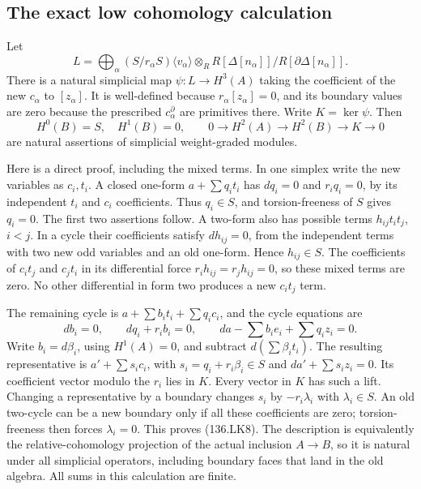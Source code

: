 \subsection{The exact low cohomology calculation}

Let
\[
 L=\bigoplus_\alpha(S/r_\alpha S)\langle v_\alpha\rangle
       \otimes_R
       R[\Delta[n_\alpha]]/R[\partial\Delta[n_\alpha]].
                                                               \tag{136.LK7}
\]
There is a natural simplicial map
\(\psi:L\to H^3(A)\) taking the coefficient of the new
\(c_\alpha\) to \([z_\alpha]\).  It is well-defined
because \(r_\alpha[z_\alpha]=0\), and its boundary values
are zero because the prescribed \(c_\alpha^\partial\)
are primitives there.  Write \(K=\ker\psi\).  Then
\[
 H^0(B)=S,\quad H^1(B)=0,\qquad
 0\longrightarrow H^2(A)\longrightarrow H^2(B)
                   \longrightarrow K\longrightarrow0
                                                               \tag{136.LK8}
\]
are natural assertions of simplicial weight-graded modules.

Here is a direct proof, including the mixed terms.  In one
simplex write the new variables as \(c_i,t_i\).  A closed
one-form \(a+\sum q_i t_i\) has \(dq_i=0\) and
\(r_iq_i=0\), by its independent \(t_i\) and \(c_i\)
coefficients.  Thus \(q_i\in S\), and torsion-freeness
of \(S\) gives \(q_i=0\).  The first two assertions follow.
A two-form also has possible terms \(h_{ij}t_it_j\),
\(i<j\).  In a cycle their coefficients satisfy
\(dh_{ij}=0\), from the independent terms with two new odd
variables and an old one-form.  Hence \(h_{ij}\in S\).
The coefficients of \(c_it_j\) and \(c_jt_i\) in its
differential force \(r_i h_{ij}=r_j h_{ij}=0\), so these
mixed terms are zero.  No other differential in form two
produces a new \(c_i t_j\) term.

The remaining cycle is
\(a+\sum b_i t_i+\sum q_i c_i\), and the cycle equations are
\[
 db_i=0,\qquad dq_i+r_i b_i=0,\qquad
              da-\sum b_i e_i+\sum q_i z_i=0.
                                                               \tag{136.LK9}
\]
Write \(b_i=d\beta_i\), using \(H^1(A)=0\), and
subtract \(d(\sum\beta_i t_i)\).  The resulting representative
is \(a'+\sum s_i c_i\), with \(s_i=q_i+r_i\beta_i\in S\)
and \(da'+\sum s_i z_i=0\).  Its coefficient vector modulo
the \(r_i\) lies in \(K\).  Every vector in \(K\) has
such a lift.  Changing a representative by a boundary changes
\(s_i\) by \(-r_i\lambda_i\) with \(\lambda_i\in S\).
An old two-cycle can be a new boundary only if all these
coefficients are zero; torsion-freeness then forces
\(\lambda_i=0\).  This proves (136.LK8).  The description
is equivalently the relative-cohomology projection of the
actual inclusion \(A\to B\), so it is natural under all
simplicial operators, including boundary faces that land in
the old algebra.  All sums in this calculation are finite.

